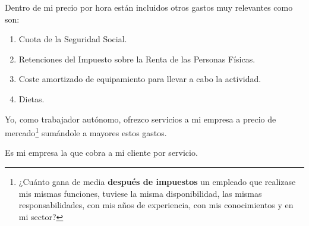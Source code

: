 Dentro de mi precio por hora están incluidos otros gastos muy relevantes como son:

\begin{enumerate}
    \item Cuota de la Seguridad Social.
    \item Retenciones del Impuesto sobre la Renta de las Personas Físicas.
    \item Coste amortizado de equipamiento para llevar a cabo la actividad.
    \item Dietas.
\end{enumerate}

Yo, como trabajador autónomo, ofrezco servicios a mi empresa a precio de mercado\footnote{%
    ¿Cuánto gana de media \textbf{después de impuestos} un empleado que realizase mis mismas
    funciones, tuviese la misma disponibilidad, las mismas responsabilidades, con mis años
    de experiencia, con mis conocimientos y en mi sector?
}
sumándole a mayores estos gastos.

Es mi empresa la que cobra a mi cliente por servicio.
